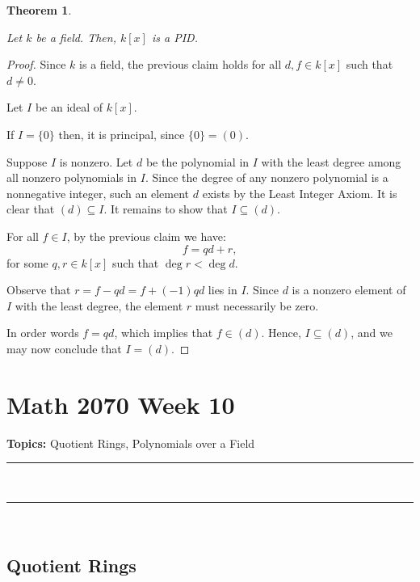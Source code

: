 \documentclass[a4paper,12pt]{report}
\newcounter{statement}
\numberwithin{statement}{chapter}
\newtheorem{thm}[statement]{Theorem}
\numberwithin{equation}{chapter}
\numberwithin{section}{chapter}
\numberwithin{subsection}{section}
\begin{document}
\begin{thm}
\label{thm:pidpoly}


Let $k$ be a field.  Then, $k[x]$ is a PID.
\end{thm}
\begin{proof}

Since $k$ is a field, the previous claim holds for all $d, f \in k[x]$ such that $d \neq 0$.





Let $I$ be an ideal of $k[x]$.



If $I = \{0\}$ then, it is principal, since $\{0\} = (0)$.



Suppose $I$ is nonzero.
Let $d$ be the polynomial in $I$ with the least degree among all nonzero polynomials
in $I$.
Since the degree of any nonzero polynomial is a nonnegative integer,
such an element $d$ exists by the Least Integer Axiom.
It is clear that $(d) \subseteq I$.  It remains to show that $I \subseteq (d)$.





For all $f \in I$, by the previous claim we have:
\[
f = qd + r,
\]
for some $q, r \in k[x]$ such that $\deg r < \deg d$.





Observe that $r = f - qd = f + (-1)qd$ lies in $I$.
Since $d$ is a nonzero element of $I$ with the least degree, the element $r$ must necessarily be zero.


In order words $f = qd$, which implies that $f \in (d)$.
Hence, $I \subseteq (d)$, and we may now conclude that $I = (d)$.


\end{proof}



\setcounter{chapter}{10}\setcounter{section}{0}
\setcounter{subsection}{0}
\setcounter{statement}{0}

\chapter*{Math 2070 Week 10}
{\bf Topics: }Quotient Rings, Polynomials over a Field
\hrule




\quad\\\hrule
\quad\\
\section*{Quotient Rings}
\end{document}
